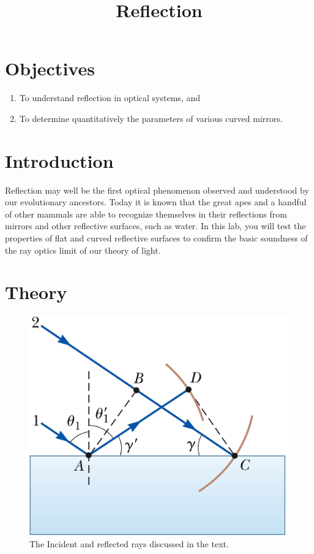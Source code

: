 \documentclass[12pt]{article}
\title{Reflection}
\author{}
\date{}
\begin{document}
\maketitle

\section{Objectives}
\label{sec:objectives}

\begin{enumerate}
\item To understand reflection in optical systems, and
\item To determine quantitatively the parameters of various curved
  mirrors. 
\end{enumerate}

\section{Introduction}
\label{sec:introduction}

Reflection may well be the first optical phenomenon observed and
understood by our evolutionary ancestors.  Today it is known that the
great apes and a handful of other mammals are able to recognize
themselves in their reflections from mirrors and other reflective
surfaces, such as water.  In this lab, you will test the properties of
flat and curved reflective surfaces to confirm the basic soundness of
the ray optics limit of our theory of light.

\section{Theory}
\label{sec:theory}

\begin{figure}
  \centering
  \includegraphics[width=\textwidth/2]{figures/3519}  
  \caption{The Incident and reflected rays discussed in the text.}
  \label{fig:defs}
\end{figure}
\end{document}
